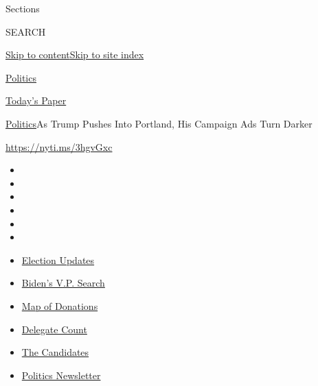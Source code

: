 Sections

SEARCH

\protect\hyperlink{site-content}{Skip to
content}\protect\hyperlink{site-index}{Skip to site index}

\href{https://www.nytimes.com/section/politics}{Politics}

\href{https://myaccount.nytimes.com/auth/login?response_type=cookie\&client_id=vi}{}

\href{https://www.nytimes.com/section/todayspaper}{Today's Paper}

\href{/section/politics}{Politics}\textbar{}As Trump Pushes Into
Portland, His Campaign Ads Turn Darker

\url{https://nyti.ms/3hgvGxc}

\begin{itemize}
\item
\item
\item
\item
\item
\item
\end{itemize}

\begin{itemize}
\item
  \href{https://www.nytimes.com/2020/07/31/us/elections/biden-vs-trump.html?action=click\&pgtype=Article\&state=default\&region=TOP_BANNER\&context=storylines_menu}{Election
  Updates}
\item
  \href{https://www.nytimes.com/article/biden-vice-president-2020.html?action=click\&pgtype=Article\&state=default\&region=TOP_BANNER\&context=storylines_menu}{Biden's
  V.P. Search}
\item
  \href{https://www.nytimes.com/interactive/2020/07/24/us/politics/trump-biden-campaign-donors.html?action=click\&pgtype=Article\&state=default\&region=TOP_BANNER\&context=storylines_menu}{Map
  of Donations}
\item
  \href{https://www.nytimes.com/interactive/2020/us/elections/delegate-count-primary-results.html?action=click\&pgtype=Article\&state=default\&region=TOP_BANNER\&context=storylines_menu}{Delegate
  Count}
\item
  \href{https://www.nytimes.com/interactive/2019/us/politics/2020-presidential-candidates.html?action=click\&pgtype=Article\&state=default\&region=TOP_BANNER\&context=storylines_menu}{The
  Candidates}
\item
  \href{https://www.nytimes.com/newsletters/politics?action=click\&pgtype=Article\&state=default\&region=TOP_BANNER\&context=storylines_menu}{Politics
  Newsletter}
\end{itemize}

